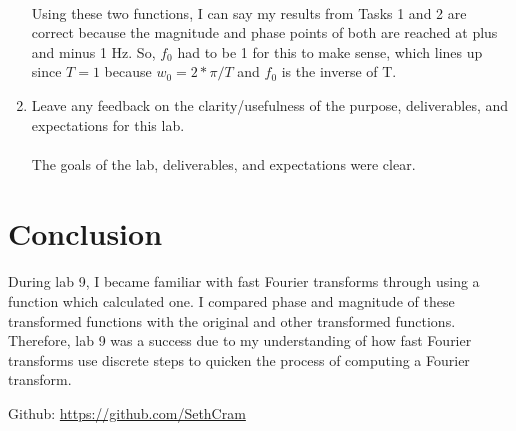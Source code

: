 \documentclass[12pt]{report}
\begin{document}
\begin{enumerate}
        \paragraph{} Using these two functions, I can say my results from Tasks 1 and 2 are correct because the magnitude and phase points of both are reached at plus and minus 1 Hz. So, $f_0$ had to be 1 for this to make sense, which lines up since $T=1$ because $w_0 = 2*\pi/T$ and $f_0$ is the inverse of T. 
                
        \item Leave any feedback on the clarity/usefulness of the purpose, deliverables, and expectations for this lab.
        \paragraph{} The goals of the lab, deliverables, and expectations were clear. 
    \end{enumerate}

\section{Conclusion}


    \paragraph{} During lab 9, I became familiar with fast Fourier transforms through using a function which calculated one. I compared phase and magnitude of these transformed functions with the original and other transformed functions. Therefore, lab 9 was a success due to my understanding of how fast Fourier transforms use discrete steps to quicken the process of computing a Fourier transform.  
    
    Github: \url{https://github.com/SethCram} 

\newpage
\end{document}
